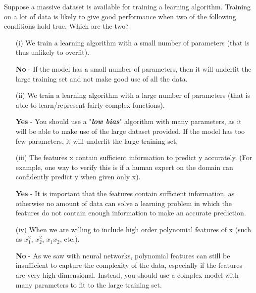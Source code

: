 \documentclass[11pt]{article} %
\begin{document}
Suppose a massive dataset is available for training a learning algorithm. Training on a lot of data is likely to give good performance when two of the following conditions hold true. Which are the two?
\begin{itemize}
	\item[(i)] We train a learning algorithm with a small number of parameters (that is thus unlikely to overfit).	
	
	\textbf{No} - If the model has a small number of parameters, then it will underfit the large training set and not make good use of all the data.
	\item[(ii)] We train a learning algorithm with a large number of parameters (that is able to learn/represent fairly complex functions).	
	
	\textbf{Yes} - You should use a "\textit{\textbf{low bias}}" algorithm with many parameters, as it will be able to make use of the large dataset provided. If the model has too few parameters, it will underfit the large training set.
	\item[(iii)] The features x contain sufficient information to predict y accurately. (For example, one way to verify this is if a human expert on the domain can confidently predict y when given only x).	
	
	\textbf{Yes} - It is important that the features contain sufficient information, as otherwise no amount of data can solve a learning problem in which the features do not contain enough information to make an accurate prediction.
	\item[(iv)]When we are willing to include high order polynomial features of x (such as $x^2_1$, $x^2_2$, $x_1x_2$, etc.).	
	
	\textbf{No} - As we saw with neural networks, polynomial features can still be insufficient to capture the complexity of the data, especially if the features are very high-dimensional. Instead, you should use a complex model with many parameters to fit to the large training set.
	
\end{itemize}
\end{document}
